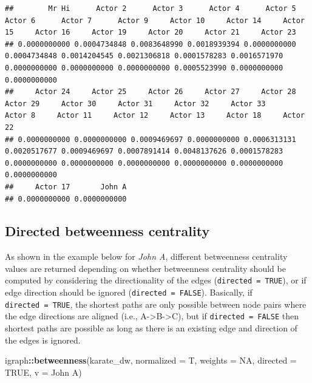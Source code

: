 \documentclass[
]{book}
\newenvironment{Shaded}{\begin{snugshade}}{\end{snugshade}}
\newcommand{\AttributeTok}[1]{\textcolor[rgb]{0.13,0.29,0.53}{#1}}
\newcommand{\ConstantTok}[1]{\textcolor[rgb]{0.56,0.35,0.01}{#1}}
\newcommand{\FunctionTok}[1]{\textcolor[rgb]{0.13,0.29,0.53}{\textbf{#1}}}
\newcommand{\NormalTok}[1]{#1}
\newcommand{\SpecialCharTok}[1]{\textcolor[rgb]{0.81,0.36,0.00}{\textbf{#1}}}
\newcommand{\StringTok}[1]{\textcolor[rgb]{0.31,0.60,0.02}{#1}}
\begin{document}
\begin{verbatim}
##        Mr Hi      Actor 2      Actor 3      Actor 4      Actor 5      Actor 6      Actor 7      Actor 9     Actor 10     Actor 14     Actor 15     Actor 16     Actor 19     Actor 20     Actor 21     Actor 23 
## 0.0000000000 0.0004734848 0.0083648990 0.0018939394 0.0000000000 0.0004734848 0.0014204545 0.0021306818 0.0001578283 0.0016571970 0.0000000000 0.0000000000 0.0000000000 0.0005523990 0.0000000000 0.0000000000 
##     Actor 24     Actor 25     Actor 26     Actor 27     Actor 28     Actor 29     Actor 30     Actor 31     Actor 32     Actor 33      Actor 8     Actor 11     Actor 12     Actor 13     Actor 18     Actor 22 
## 0.0000000000 0.0000000000 0.0009469697 0.0000000000 0.0006313131 0.0020517677 0.0009469697 0.0007891414 0.0048137626 0.0001578283 0.0000000000 0.0000000000 0.0000000000 0.0000000000 0.0000000000 0.0000000000 
##     Actor 17       John A 
## 0.0000000000 0.0000000000
\end{verbatim}

\subsection{Directed betweenness centrality}\label{directed-betweenness-centrality}

As shown in the example below for \emph{John A}, different betweenness centrality values are returned depending on whether betweenness centrality should be computed by considering the directionality of the edges (\texttt{directed\ =\ TRUE}), or if edge direction should be ignored (\texttt{directed\ =\ FALSE}). Basically, if \texttt{directed\ =\ TRUE}, the shortest paths are only possible between node pairs where the edge directions are aligned (i.e., A-\textgreater B-\textgreater C), but if \texttt{directed\ =\ FALSE} then shortest paths are possible as long as there is an existing edge and direction of the edges is ignored.

\begin{Shaded}
\begin{Highlighting}[]
\NormalTok{igraph}\SpecialCharTok{::}\FunctionTok{betweenness}\NormalTok{(karate\_dw, }\AttributeTok{normalized =}\NormalTok{ T, }\AttributeTok{weights =} \ConstantTok{NA}\NormalTok{, }\AttributeTok{directed =} \ConstantTok{TRUE}\NormalTok{, }\AttributeTok{v =} \StringTok{\textquotesingle{}John A\textquotesingle{}}\NormalTok{)}
\end{Highlighting}
\end{Shaded}
\end{document}
